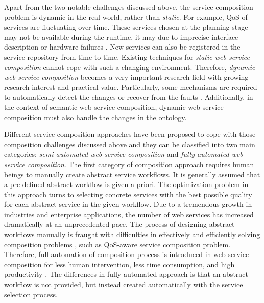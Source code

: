 Apart from the two notable challenges discussed above, the service composition problem is dynamic in the real world, rather than \emph{static}. For example, QoS of services are fluctuating over time. These services chosen at the planning stage may not be available during the runtime, it may due to imprecise interface description \cite{ishikawa2011bridging} or hardware failures \cite{guinard2009discovery}. New services can also be registered in the service repository from time to time. Existing techniques for \emph{static web service composition} cannot cope with such a changing environment. Therefore, \emph{dynamic web service composition} becomes a very important research field with growing research interest and practical value. Particularly, some mechanisms are required to automatically detect the changes or recover from the faults \cite{chan2009fault}. Additionally, in the context of semantic web service composition, dynamic web service composition must also handle the changes in the ontology.


Different service composition approaches \cite{da2016genetic,da2016particle,gupta2015optimization,lecue2009optimizing,ma2015hybrid,qi2010combining,rodriguez2010composition,yu2013adaptive,wang2014automated} have been proposed to cope with those composition challenges discussed above and they can be classified into two main categories: \emph{semi-automated web service composition} and \emph{fully automated web service composition}. The first category of composition approach requires human beings to manually create abstract service workflows. It is generally assumed that a pre-defined abstract workflow is given a priori. The optimization problem in this approach turns to selecting concrete services with the best possible quality for each abstract service in the given workflow. Due to a tremendous growth in industries and enterprise applications, the number of web services has increased dramatically at an unprecedented pace. The process of designing abstract workflows  manually is fraught with difficulties in effectively and efficiently solving composition problems \cite{lecue2009optimizing}, such as QoS-aware service composition problem. Therefore, full automation of composition process is introduced in web service composition for less human intervention, less time consumption, and high productivity \cite{rao2004survey}. The differences in fully automated approach is that an abstract workflow is not provided, but instead created automatically with the service selection process. 


